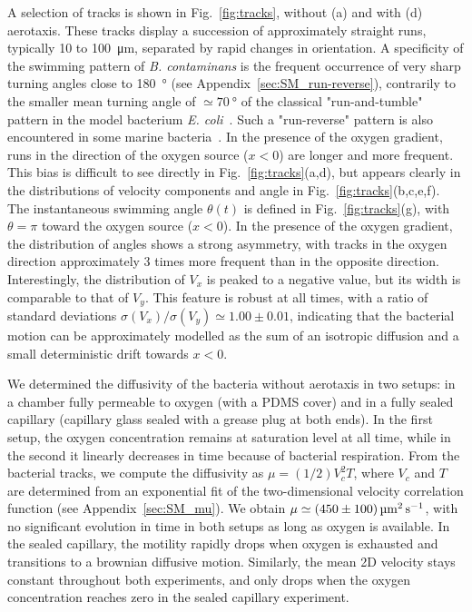 \documentclass[aps,a4paper,twocolumn,10pt,pre,showpacs]{revtex4-2}
\begin{document}
A selection of tracks is shown in Fig.~\ref{fig:tracks}, without (a) and with (d) aerotaxis. These tracks display a succession of approximately straight runs, typically 10 to \SI{100}{\um}, separated by rapid changes in orientation. A specificity of the swimming pattern of \emph{B. contaminans} is the frequent occurrence of very sharp turning angles close to \SI{180}{\degree} (see Appendix~\ref{sec:SM_run-reverse}), contrarily to the smaller mean turning angle of $\simeq \SI{70}{\degree}$ of the classical "run-and-tumble" pattern in the model bacterium \emph{E. coli}~\cite{berg1972chemotaxis,berg1993random}. Such a "run-reverse" pattern is also encountered in some marine bacteria~\cite{barbara2003bacterial,taktikos2013motility,grognot2021multiscale}. In the presence of the oxygen gradient, runs in the direction of the oxygen source ($x<0$) are longer and more frequent. This bias is difficult to see directly in Fig.~\ref{fig:tracks}(a,d), but appears clearly in the distributions of velocity components and angle in Fig.~\ref{fig:tracks}(b,c,e,f). The instantaneous swimming angle $\theta(t)$ is defined in  Fig.~\ref{fig:tracks}(g), with $\theta=\pi$ toward the oxygen source ($x<0$). In the presence of the oxygen gradient, the distribution of angles shows a strong asymmetry, with tracks in the oxygen direction approximately 3 times more frequent than in the opposite direction. Interestingly, the distribution of $V_x$ is peaked to a negative value, but its width is comparable to that of $V_y$. This feature is robust at all times, with a ratio of standard deviations $\sigma(V_x) / \sigma(V_y) \simeq 1.00 \pm 0.01$, indicating that the bacterial motion can be approximately modelled as the sum of an isotropic diffusion and a small deterministic drift towards $x<0$.
 

We determined the diffusivity of the bacteria without aerotaxis in two setups: in a chamber fully permeable to oxygen (with a PDMS cover) and in a fully sealed capillary (capillary glass sealed with a grease plug at both ends). In the first setup, the oxygen concentration remains at saturation level at all time, while in the second it linearly decreases in time because of bacterial respiration. From the bacterial tracks, we compute the diffusivity as $\mu = (1/2) V_c^2 T$, where $V_c$ and $T$ are determined from an exponential fit of the two-dimensional velocity correlation function (see Appendix~\ref{sec:SM_mu}). We obtain $\mu \simeq \SI{450\pm100}{\square\um\per\s}$, with no significant evolution in time in both setups as long as oxygen is available. In the sealed capillary, the motility rapidly drops when oxygen is exhausted and transitions to a brownian diffusive motion. Similarly, the mean 2D velocity stays constant throughout both experiments, and only drops when the oxygen concentration reaches zero in the sealed capillary experiment.
\end{document}
